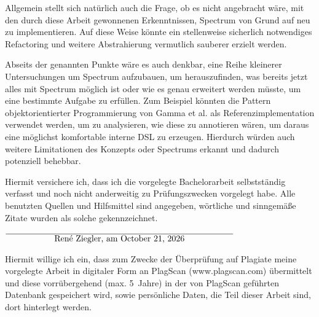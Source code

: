 \documentclass[12pt,oneside,a4paper,parskip]{scrbook}
\def\BaAuthor{René Ziegler}
\begin{document}
Allgemein stellt sich natürlich auch die Frage, ob es nicht angebracht wäre, mit den durch diese Arbeit gewonnenen Erkenntnissen, Spectrum von Grund auf neu zu implementieren. Auf diese Weise könnte ein stellenweise sicherlich notwendiges Refactoring und weitere Abstrahierung vermutlich sauberer erzielt werden.

Abseits der genannten Punkte wäre es auch denkbar, eine Reihe kleinerer Untersuchungen um Spectrum aufzubauen, um herauszufinden, was bereits jetzt alles mit Spectrum möglich ist oder wie es genau erweitert werden müsste, um eine bestimmte Aufgabe zu erfüllen. Zum Beispiel könnten die Pattern objektorientierter Programmierung von Gamma et al. als Referenzimplementation verwendet werden, um zu analysieren, wie diese zu annotieren wären, um daraus eine möglichst komfortable interne DSL zu erzeugen. Hierdurch würden auch weitere Limitationen des Konzepts oder Spectrums erkannt und dadurch potenziell behebbar.

\appendix

\backmatter

\listoffigures
{}


\lstlistoflistings
{}

\printbibliography
{}



Hiermit versichere ich, dass ich die vorgelegte Bachelorarbeit selbstständig verfasst und noch nicht anderweitig zu Prüfungszwecken vorgelegt habe. Alle benutzten Quellen und Hilfsmittel sind angegeben, wörtliche und sinngemäße Zitate wurden als solche gekennzeichnet.

\vspace{20pt}
\begin{flushright}
$\overline{~~~~~~~~~~~~~~~~~\mbox{\BaAuthor, am \today}~~~~~~~~~~~~~~~~~}$
\end{flushright}


Hiermit willige ich ein, dass zum Zwecke der Überprüfung auf Plagiate meine vorgelegte Arbeit in digitaler Form an PlagScan (www.plagscan.com) übermittelt und diese vorrübergehend (max. 5~Jahre) in der von PlagScan geführten Datenbank gespeichert wird, sowie persönliche Daten, die Teil dieser Arbeit sind, dort hinterlegt werden.
\end{document}
